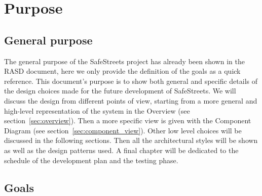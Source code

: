 \section{Purpose}
\subsection{General purpose}
The general purpose of the SafeStreets project has already been shown in the
RASD document, here we only provide the definition of the goals as a quick
reference. This document's purpose is to show both general and specific details
of the design choices made for the future development of SafeStreets. We will
discuss the design from different points of view, starting from a more general
and high-level representation of the system in the Overview (see
section~\ref{sec:overview}). Then a more specific view is given with the
Component Diagram (see section~\ref{sec:component_view}). Other low level
choices will be discussed in the following sections. Then all the architectural
styles will be shown as well as the design patterns used. A final chapter will
be dedicated to the schedule of the development plan and the testing phase.

\subsection{Goals}

\begin{description}
\end{description}